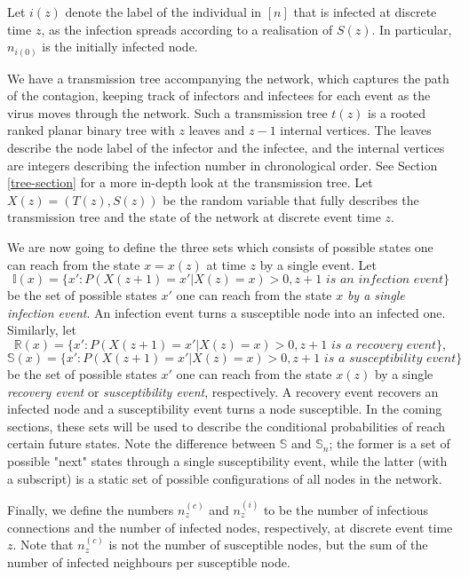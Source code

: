 \documentclass[12pt]{article} %
\numberwithin{equation}{section}
\begin{document}
 
Let $i(z)$ denote the label of the individual in $[n]$ that is infected at discrete time $z$, as the infection spreads according to a realisation of $S(z)$. 
In particular, $n_{i(0)}$ is the initially infected node.

We have a transmission tree accompanying the network, which captures the path of the contagion, keeping track of infectors and infectees for each event as the virus moves through the network. Such a transmission tree $t(z)$ is a rooted ranked planar binary tree with $z$ leaves and $z-1$ internal vertices. 
The leaves describe the node label of the infector and the infectee, and the internal vertices are integers describing the infection number in chronological order. 
See Section \ref{tree-section} for a more in-depth look at the transmission tree. 
Let $X(z) = (T(z),S(z))$ be the random variable that fully describes the transmission tree and the state of the network at discrete event time $z$. 

We are now going to define the three sets which consists of possible states one can reach from the state $x = x(z)$ at time $z$ by a single event. 
Let $$\mathbb{I}(x) = \{x': P(X(z+1) = x' | X(z) = x) > 0, z+1 \textit{ is an infection event}\}$$ be the set of possible states $x'$ one can reach from the state $x$ \textit{by a single infection event}. 
An infection event turns a susceptible node into an infected one. 
Similarly, let
$$\mathbb{R}(x) = \{x': P(X(z+1) = x' | X(z) = x) > 0, z+1 \textit{ is a recovery event}\},$$
$$\mathbb{S}(x) = \{x': P(X(z+1) = x' | X(z) = x) > 0, z+1 \textit{ is a susceptibility event}\}$$
be the set of possible states $x'$ one can reach from the state $x(z)$ by a single \textit{recovery event} or \textit{susceptibility event}, respectively. 
A recovery event recovers an infected node and a susceptibility event turns a node susceptible. In the coming sections, these sets will be used to describe the conditional probabilities of reach certain future states. Note the difference between $\mathbb{S}$ and $\mathbb{S}_n$; the former is a set of possible "next" states through a single susceptibility event, while the latter (with a subscript) is a static set of possible configurations of all nodes in the network. 

Finally, we define the numbers $n^{(c)}_z$ and $n^{(i)}_z$ to be the number of infectious connections and the number of infected nodes, respectively, at discrete event time $z$. Note that $n^{(c)}_z$ is not the number of susceptible nodes, but the sum of the number of infected neighbours per susceptible node.
\end{document}
